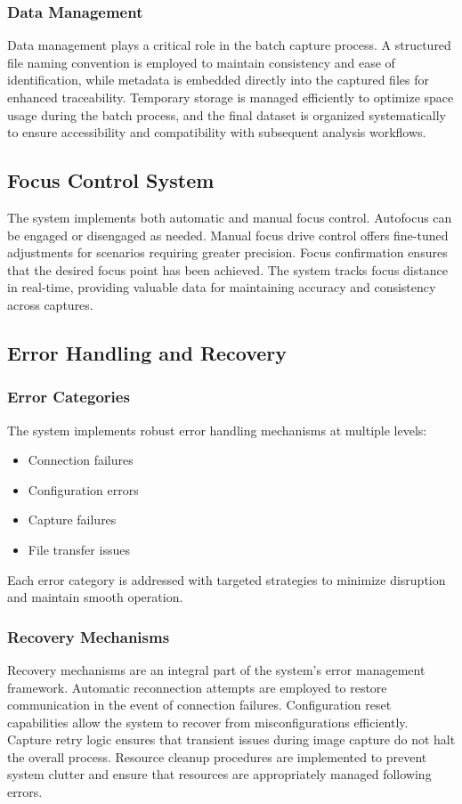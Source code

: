 \subsubsection{Data Management}
Data management plays a critical role in the batch capture process. A structured file naming convention is employed to maintain consistency and ease of identification, while metadata is embedded directly into the captured files for enhanced traceability. Temporary storage is managed efficiently to optimize space usage during the batch process, and the final dataset is organized systematically to ensure accessibility and compatibility with subsequent analysis workflows.

\subsection{Focus Control System}

The system implements both automatic and manual focus control. Autofocus can be engaged or disengaged as needed. Manual focus drive control offers fine-tuned adjustments for scenarios requiring greater precision. Focus confirmation ensures that the desired focus point has been achieved. The system tracks focus distance in real-time, providing valuable data for maintaining accuracy and consistency across captures.

\subsection{Error Handling and Recovery}

\subsubsection{Error Categories}
The system implements robust error handling mechanisms at multiple levels:

\begin{itemize}
    \item Connection failures
    \item Configuration errors
    \item Capture failures
    \item File transfer issues
\end{itemize}

Each error category is addressed with targeted strategies to minimize disruption and maintain smooth operation.

\subsubsection{Recovery Mechanisms}
Recovery mechanisms are an integral part of the system’s error management framework. Automatic reconnection attempts are employed to restore communication in the event of connection failures. Configuration reset capabilities allow the system to recover from misconfigurations efficiently. Capture retry logic ensures that transient issues during image capture do not halt the overall process. Resource cleanup procedures are implemented to prevent system clutter and ensure that resources are appropriately managed following errors.

